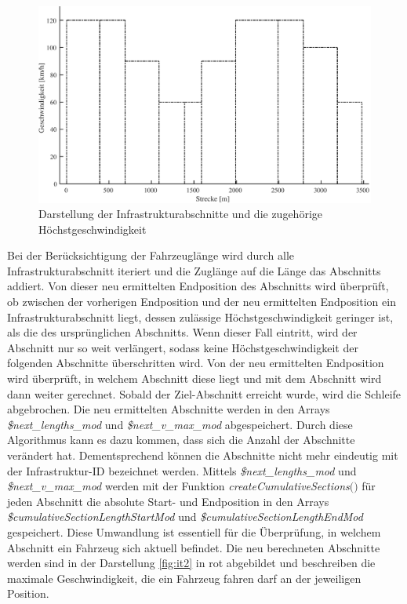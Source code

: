 \begin{figure}
  \includegraphics[width=\linewidth]{../matlab/it1.pdf}
  \caption{Darstellung der Infrastrukturabschnitte und die zugehörige Höchstgeschwindigkeit}
  \label{fig:it1}
\end{figure}

Bei der Berücksichtigung der Fahrzeuglänge wird durch alle Infrastrukturabschnitt iteriert und die Zuglänge auf die Länge das Abschnitts addiert. Von dieser neu ermittelten Endposition des Abschnitts wird überprüft, ob zwischen der vorherigen Endposition und der neu ermittelten Endposition ein Infrastrukturabschnitt liegt, dessen zulässige Höchstgeschwindigkeit geringer ist, als die des ursprünglichen Abschnitts. Wenn dieser Fall eintritt, wird der Abschnitt nur so weit verlängert, sodass keine Höchstgeschwindigkeit der folgenden Abschnitte überschritten wird. Von der neu ermittelten Endposition wird überprüft, in welchem Abschnitt diese liegt und mit dem Abschnitt wird dann weiter gerechnet. Sobald der Ziel-Abschnitt erreicht wurde, wird die Schleife abgebrochen. Die neu ermittelten Abschnitte werden in den Arrays \textit{\$next\_lengths\_mod} und \textit{\$next\_v\_max\_mod} abgespeichert. Durch diese Algorithmus kann es dazu kommen, dass sich die Anzahl der Abschnitte verändert hat. Dementsprechend können die Abschnitte nicht mehr eindeutig mit der Infrastruktur-ID bezeichnet werden. Mittels \textit{\$next\_lengths\_mod} und \textit{\$next\_v\_max\_mod} werden mit der Funktion \textit{createCumulativeSections$($$)$} für jeden Abschnitt die absolute Start- und Endposition in den Arrays \textit{\$cumulativeSectionLengthStartMod} und \textit{\$cumulativeSectionLengthEndMod} gespeichert. Diese Umwandlung ist essentiell für die Überprüfung, in welchem Abschnitt ein Fahrzeug sich aktuell befindet. Die neu berechneten Abschnitte werden sind in der Darstellung \ref{fig:it2} in rot abgebildet und beschreiben die maximale Geschwindigkeit, die ein Fahrzeug fahren darf an der jeweiligen Position.

